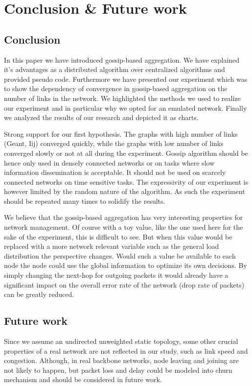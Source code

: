 \section{Conclusion \& Future work}
\label{sec:conclusion}

\subsection{Conclusion}
In this paper we have introduced gossip-based aggregation. We have explained it's advantages as a distributed algorithm over centralized algorithms and provided pseudo code. Furthermore we have presented our experiment which was to show the dependency of convergence in gossip-based aggregation on the number of links in the network. We highlighted the methods we used to realize our experiment and in particular why we opted for an emulated network. Finally we analyzed the results of our research and depicted it as charts.

Strong support for our first hypothesis. The graphs with high number of links (Geant, Iij) converged quickly, while the graphs with low number of links converged slowly or not at all during the experiment. Gossip algorithm should be hence only used in densely connected networks or on tasks where slow information dissemination is acceptable. It should not be used on scarcely connected networks on time sensitive tasks. The expressivity of our experiment is however limited by the random nature of the algorithm. As such the experiment should be repeated many times to solidify the results.

We believe that the gossip-based aggregation has very interesting properties for network management. Of course with a toy value, like the one used here for the sake of the experiment, this is difficult to see. But when this value would be replaced with a more network relevant variable such as the general load distribution the perspective changes. Would such a value be available to each node the node could use the global information to optimize its own decisions. By simply changing the next-hop for outgoing packets it would already have a significant impact on the overall error rate of the network (drop rate of packets) can be greatly reduced.

\subsection{Future work}
Since we assume an undirected unweighted static topology, some other crucial properties of a real network are not reflected in our study, such as link speed and congestion. Although, in real backbone networks, node leaving and joining are not likely to happen, but packet loss and delay could be modeled into churn mechanism and should be considered in future work.\\

